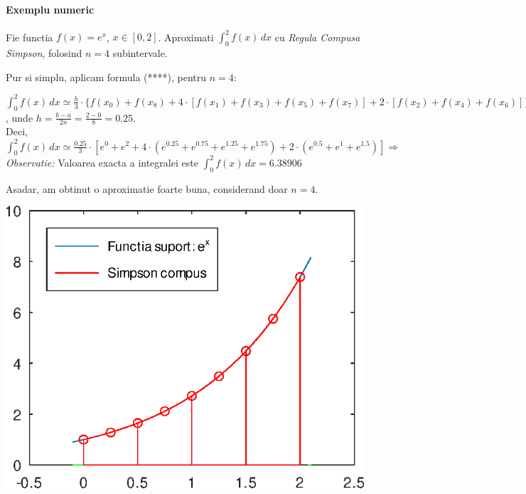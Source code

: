 \documentclass{article}
\begin{document}
\paragraph{Exemplu numeric}

\tabto{0.5cm}\begin{minipage}{0.8\textwidth}
    \vspace{0.5cm}\tabto{0.5cm} Fie functia $f(x) = e^x$, $x \in [0, 2]$. Aproximati $\int_0^2 f(x)\, dx$ cu \textit{Regula Compusa Simpson}, folosind $n=4$ subintervale. 
    
    \tabto{0.5cm} Pur si simplu, aplicam formula (****), pentru $n=4$:
    
    $\int_0^2 f(x)\, dx \simeq \frac{h}{3} \cdot \{f(x_0) + f(x_{8}) + 4 \cdot [f(x_1) + f(x_3) + f(x_5) + f(x_7)] + 2 \cdot  [f(x_2) + f(x_4) + f(x_6)]\}$, unde $h = \frac{b-a}{2n} = \frac{2-0}{8} = 0.25$. \\
    
    \tabto{0.5cm} Deci, $\int_0^2 f(x)\, dx \simeq \frac{0.25}{3} \cdot [e^0 + e^2 + 4 \cdot (e^{0.25} + e^{0.75} + e^{1.25} + e^{1.75}) + 2 \cdot (e^{0.5} + e^1 + e^{1.5})] \Longrightarrow$  \\
    
    \tabto{0.5cm} \textit{Observatie:} Valoarea exacta a integralei este $\int_0^2 f(x)\, dx = 6.38906$
    
    \tabto{0.5cm} Asadar, am obtinut o aproximatie foarte buna, considerand doar $n=4$.
\end{minipage}\hspace{0.1cm}
\begin{minipage}{0.55\textwidth}
    \includegraphics[scale=0.6]{simpson_compus_ex}
\end{minipage}\\
\end{document}
